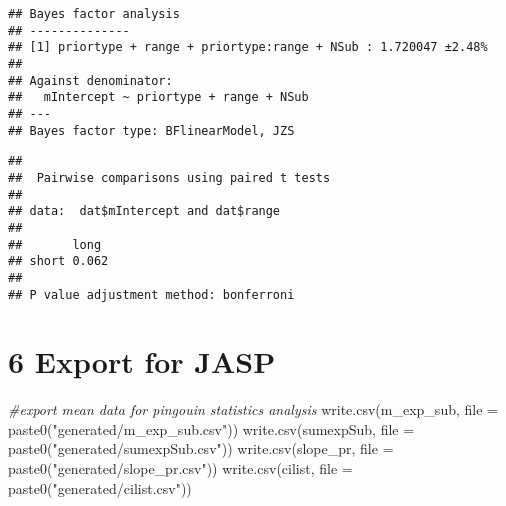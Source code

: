 \documentclass[
]{article}
\newenvironment{Shaded}{\begin{snugshade}}{\end{snugshade}}
\newcommand{\AttributeTok}[1]{\textcolor[rgb]{0.77,0.63,0.00}{#1}}
\newcommand{\CommentTok}[1]{\textcolor[rgb]{0.56,0.35,0.01}{\textit{#1}}}
\newcommand{\FunctionTok}[1]{\textcolor[rgb]{0.00,0.00,0.00}{#1}}
\newcommand{\NormalTok}[1]{#1}
\newcommand{\OtherTok}[1]{\textcolor[rgb]{0.56,0.35,0.01}{#1}}
\newcommand{\SpecialCharTok}[1]{\textcolor[rgb]{0.00,0.00,0.00}{#1}}
\newcommand{\StringTok}[1]{\textcolor[rgb]{0.31,0.60,0.02}{#1}}
\begin{document}
\begin{verbatim}
## Bayes factor analysis
## --------------
## [1] priortype + range + priortype:range + NSub : 1.720047 ±2.48%
## 
## Against denominator:
##   mIntercept ~ priortype + range + NSub 
## ---
## Bayes factor type: BFlinearModel, JZS
\end{verbatim}

\begin{Shaded}
\end{Shaded}

\begin{verbatim}
## 
##  Pairwise comparisons using paired t tests 
## 
## data:  dat$mIntercept and dat$range 
## 
##       long 
## short 0.062
## 
## P value adjustment method: bonferroni
\end{verbatim}

\hypertarget{export-for-jasp}{%
\section{6 Export for JASP}\label{export-for-jasp}}

\begin{Shaded}
\begin{Highlighting}[]
\CommentTok{\#export mean data for pingouin statistics analysis }
\FunctionTok{write.csv}\NormalTok{(m\_exp\_sub, }\AttributeTok{file =} \FunctionTok{paste0}\NormalTok{(}\StringTok{"generated/m\_exp\_sub.csv"}\NormalTok{))}
\FunctionTok{write.csv}\NormalTok{(sumexpSub, }\AttributeTok{file =} \FunctionTok{paste0}\NormalTok{(}\StringTok{"generated/sumexpSub.csv"}\NormalTok{))}
\FunctionTok{write.csv}\NormalTok{(slope\_pr, }\AttributeTok{file =} \FunctionTok{paste0}\NormalTok{(}\StringTok{"generated/slope\_pr.csv"}\NormalTok{))}
\FunctionTok{write.csv}\NormalTok{(cilist, }\AttributeTok{file =} \FunctionTok{paste0}\NormalTok{(}\StringTok{"generated/cilist.csv"}\NormalTok{))}
\end{Highlighting}
\end{Shaded}
\end{document}
